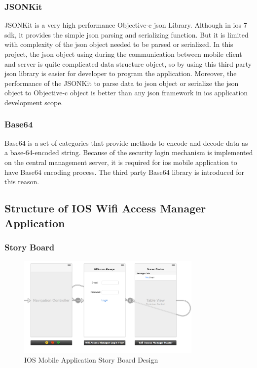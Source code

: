 \subsubsection{JSONKit}
\par JSONKit\cite{jsonkit} is a very high performance Objective-c \gls{json} Library. Although in \gls{ios} 7 \gls{sdk}, it provides the simple \gls{json} parsing and serializing function. But it is limited with complexity of the \gls{json} object needed to be parsed or serialized. In this project, the \gls{json} object using during the communication between mobile client and server is quite complicated data structure object, so by using this third party \gls{json} library is easier for developer to program the application. Moreover, the performance of the JSONKit to parse data to \gls{json} object or serialize the \gls{json} object to Objective-c object is better than any \gls{json} framework in \gls{ios} application development scope.

\subsubsection{Base64}
\par Base64\cite{base64lib} is a set of categories that provide methods to encode and decode data as a base-64-encoded string. Because of the security login mechanism is implemented on the central management server, it is required for \gls{ios} mobile application to have Base64 encoding process. The third party Base64 library is introduced for this reason.

\subsection{Structure of IOS Wifi Access Manager Application}

\subsubsection{Story Board}

\begin{figure}
	\centering
    	\includegraphics[width=0.80\textwidth,natwidth=610,natheight=642]{figs/ios_app_storyboard.png}
  	\caption{IOS Mobile Application Story Board Design}
  	\label{fig:ios_storyboard}
\end{figure}

